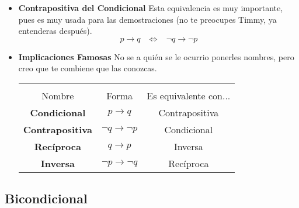 \documentclass[12pt]{report}                                    %
\DeclareMathOperator \Space {\quad}                             %
\DeclareMathOperator \MiniSpace {\;}                            %
\newcommand \lequal {\MiniSpace \Leftrightarrow \MiniSpace}     %
\begin{document}
                    \begin{itemize}
                        \item \textbf{Contrapositiva del Condicional}
                                Esta equivalencia es muy importante, pues es muy usada para las demostraciones
                                (no te preocupes Timmy, ya entenderas después).
                                \begin{equation*}
                                    p \to q \lequal \lnot q \to \lnot p
                                \end{equation*}

                        \item \textbf{Implicaciones Famosas}
                                No se a quién se le ocurrio ponerles nombres, pero creo que te combiene
                                que las conozcas.

                                \begin{tabular}{ |c|c|c| } 
                                    \hline &&\\
                                    \large{Nombre} & \large{Forma} & \large{Es equivalente con...}      \\[0.5em]
                                    \hline \hline
                                    
                                    \textbf{Condicional}    & $p \to q$             & Contrapositiva    \\ \hline
                                    \textbf{Contrapositiva} & $\lnot q \to \lnot p$ & Condicional       \\ \hline\hline 
                                    
                                    \textbf{Recíproca}      & $q \to p$             & Inversa           \\ \hline
                                    \textbf{Inversa}        & $\lnot p \to \lnot q$ & Recíproca         \\ \hline
                                \end{tabular}
                    \end{itemize}


            \clearpage
            \subsection{Bicondicional}
\end{document}
